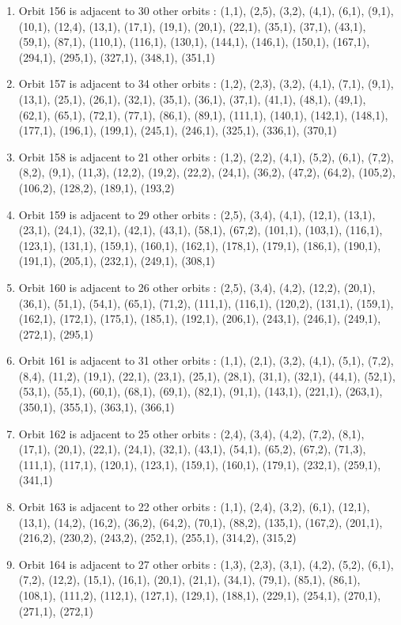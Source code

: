 \documentclass[12pt]{article}
\begin{document}
\begin{enumerate}
\item Orbit 156 is adjacent to 30 other orbits : (1,1), (2,5), (3,2), (4,1), (6,1), (9,1), (10,1), (12,4), (13,1), (17,1), (19,1), (20,1), (22,1), (35,1), (37,1), (43,1), (59,1), (87,1), (110,1), (116,1), (130,1), (144,1), (146,1), (150,1), (167,1), (294,1), (295,1), (327,1), (348,1), (351,1)
\item Orbit 157 is adjacent to 34 other orbits : (1,2), (2,3), (3,2), (4,1), (7,1), (9,1), (13,1), (25,1), (26,1), (32,1), (35,1), (36,1), (37,1), (41,1), (48,1), (49,1), (62,1), (65,1), (72,1), (77,1), (86,1), (89,1), (111,1), (140,1), (142,1), (148,1), (177,1), (196,1), (199,1), (245,1), (246,1), (325,1), (336,1), (370,1)
\item Orbit 158 is adjacent to 21 other orbits : (1,2), (2,2), (4,1), (5,2), (6,1), (7,2), (8,2), (9,1), (11,3), (12,2), (19,2), (22,2), (24,1), (36,2), (47,2), (64,2), (105,2), (106,2), (128,2), (189,1), (193,2)
\item Orbit 159 is adjacent to 29 other orbits : (2,5), (3,4), (4,1), (12,1), (13,1), (23,1), (24,1), (32,1), (42,1), (43,1), (58,1), (67,2), (101,1), (103,1), (116,1), (123,1), (131,1), (159,1), (160,1), (162,1), (178,1), (179,1), (186,1), (190,1), (191,1), (205,1), (232,1), (249,1), (308,1)
\item Orbit 160 is adjacent to 26 other orbits : (2,5), (3,4), (4,2), (12,2), (20,1), (36,1), (51,1), (54,1), (65,1), (71,2), (111,1), (116,1), (120,2), (131,1), (159,1), (162,1), (172,1), (175,1), (185,1), (192,1), (206,1), (243,1), (246,1), (249,1), (272,1), (295,1)
\item Orbit 161 is adjacent to 31 other orbits : (1,1), (2,1), (3,2), (4,1), (5,1), (7,2), (8,4), (11,2), (19,1), (22,1), (23,1), (25,1), (28,1), (31,1), (32,1), (44,1), (52,1), (53,1), (55,1), (60,1), (68,1), (69,1), (82,1), (91,1), (143,1), (221,1), (263,1), (350,1), (355,1), (363,1), (366,1)
\item Orbit 162 is adjacent to 25 other orbits : (2,4), (3,4), (4,2), (7,2), (8,1), (17,1), (20,1), (22,1), (24,1), (32,1), (43,1), (54,1), (65,2), (67,2), (71,3), (111,1), (117,1), (120,1), (123,1), (159,1), (160,1), (179,1), (232,1), (259,1), (341,1)
\item Orbit 163 is adjacent to 22 other orbits : (1,1), (2,4), (3,2), (6,1), (12,1), (13,1), (14,2), (16,2), (36,2), (64,2), (70,1), (88,2), (135,1), (167,2), (201,1), (216,2), (230,2), (243,2), (252,1), (255,1), (314,2), (315,2)
\item Orbit 164 is adjacent to 27 other orbits : (1,3), (2,3), (3,1), (4,2), (5,2), (6,1), (7,2), (12,2), (15,1), (16,1), (20,1), (21,1), (34,1), (79,1), (85,1), (86,1), (108,1), (111,2), (112,1), (127,1), (129,1), (188,1), (229,1), (254,1), (270,1), (271,1), (272,1)

\end{enumerate}
\end{document}
